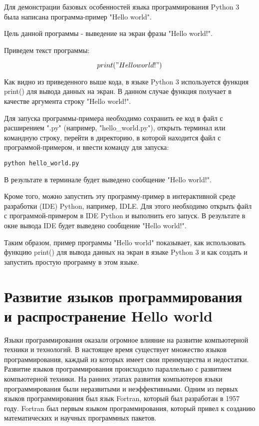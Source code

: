 \documentclass[draft]{article}
\begin{document}
Для демонстрации базовых особенностей языка программирования Python 3 была написана программа-пример "Hello world".

Цель данной программы - выведение на экран фразы "Hello world!".

Приведем текст программы:

$$
print("Hello world!")
$$

Как видно из приведенного выше кода, в языке Python 3 используется функция print() для вывода данных на экран. В данном случае функция получает в качестве аргумента строку "Hello world!".

Для запуска программы-примера необходимо сохранить ее код в файл с расширением ".py" (например, "hello\_world.py"), открыть терминал или командную строку, перейти в директорию, в которой находится файл с программой-примером, и ввести команду для запуска:

\begin{lstlisting}
python hello_world.py
\end{lstlisting}

В результате в терминале будет выведено сообщение "Hello world!".

Кроме того, можно запустить эту программу-пример в интерактивной среде разработки (IDE) Python, например, IDLE. Для этого необходимо открыть файл с программой-примером в IDE Python и выполнить его запуск. В результате в окне вывода IDE будет выведено сообщение "Hello world!".

Таким образом, пример программы "Hello world" показывает, как использовать функцию print() для вывода данных на экран в языке Python 3 и как создать и запустить простую программу в этом языке.\newpage\section{Развитие языков программирования и распространение Hello world}

Языки программирования оказали огромное влияние на развитие компьютерной техники и технологий. В настоящее время существует множество языков программирования, каждый из которых имеет свои преимущества и недостатки. Развитие языков программирования происходило параллельно с развитием компьютерной техники. На ранних этапах развития компьютеров языки программирования были неразвитыми и неэффективными. Одним из первых языков программирования был язык Fortran, который был разработан в 1957 году. Fortran был первым языком программирования, который привел к созданию математических и научных программных пакетов.
\end{document}
